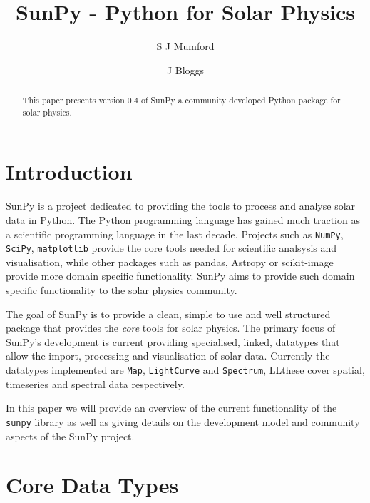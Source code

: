 \documentclass[12pt]{iopart}
\begin{document}
\title{SunPy - Python for Solar Physics}

\author{S J Mumford}
\address{Solar Physics \& Space Plasma Research Centre (SP$^{2}$RC), School of 
Mathematics and Statistics, The University of Sheffield, Hicks Building, 
Hounsfield Road, Sheffield, S3 7RH U.K.}

\author{J Bloggs}
\address{Wibble wiblle wiblle}


\begin{abstract}
This paper presents version 0.4 of SunPy a community developed Python package 
for solar physics.

\end{abstract}

\maketitle

\section{Introduction}
SunPy is a project dedicated to providing the tools to process and analyse 
solar data in Python.
The Python programming language has gained much traction as a scientific 
programming language in the last decade.
Projects such as \texttt{NumPy}, \texttt{SciPy}, \texttt{matplotlib} provide 
the core tools 
needed 
for 
scientific analsysis and visualisation, while other packages such as pandas, 
Astropy or scikit-image provide more domain specific functionality.
SunPy aims to provide such domain specific functionality to the solar physics 
community.

The goal of SunPy is to provide a clean, simple to use and well structured 
package that provides the \textit{core} tools for solar physics.
The primary focus of SunPy's development is current providing specialised, 
linked, datatypes that allow the import, processing and visualisation of solar 
data. Currently the datatypes implemented are \texttt{Map}, \texttt{LightCurve} 
and \texttt{Spectrum}, LLthese cover spatial, timeseries and spectral data 
respectively.

In this paper we will provide an overview of the current functionality of the 
\texttt{sunpy} library as well as giving details on the development model and 
community aspects of the SunPy project.



\section{Core Data Types}
	
\end{document}
